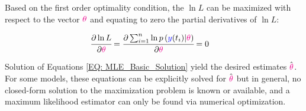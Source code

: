 \documentclass[../Article_Model_Parameters.tex]{subfiles}
\begin{document}
	Based on the first order optimality condition, the $\ln L$ can be maximized with respect to the vector ${\color{magenta} \theta}$ and equating to zero the partial derivatives of $\ln L$:
	
	{\footnotesize
		\begin{align}\label{EQ: MLE_Basic_Solution}
			\cfrac{\partial \ln L}{\partial {\color{magenta} \theta}} &= \cfrac{\partial \sum_{i=1}^{n} \ln p\left( {\color{blue}y}(t_i) | {\color{magenta} \theta} \right) }{\partial {\color{magenta} \theta}} = 0 
	\end{align} }
	
	Solution of Equations \ref{EQ: MLE_Basic_Solution} yield the desired estimates $\hat{{\color{magenta} \theta}}$. For some models, these equations can be explicitly solved for $\hat{{\color{magenta} \theta}}$ but in general, no closed-form solution to the maximization problem is known or available, and a maximum likelihood estimator can only be found via numerical optimization.
\end{document}
